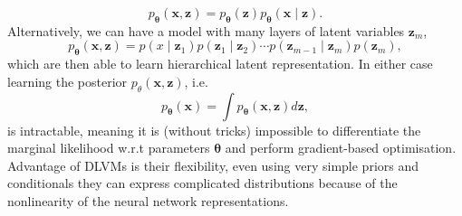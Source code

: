 \begin{equation}
	p_{\boldsymbol{\theta}}(\mathbf{x}, \mathbf{z})=p_{\boldsymbol{\theta}}(\mathbf{z}) p_{\boldsymbol{\theta}}(\mathbf{x} \mid \mathbf{z}).
\end{equation}
Alternatively, we can have a model with many layers of latent variables $\mathbf{z}_m$,
\begin{equation}
	p_{\boldsymbol{\theta}}(\mathbf{x}, \mathbf{\mathbf{z}}) = p\left(x \mid \mathbf{z}_{1}\right) p\left(\mathbf{z}_{1} \mid \mathbf{z}_{2}\right) \cdots p\left(\mathbf{z}_{m-1} \mid \mathbf{z}_{m}\right) p\left(\mathbf{z}_{m}\right),
\end{equation} 
which are then able to learn hierarchical latent representation. In either case learning the posterior $p_{\theta}(\mathbf{x}, \mathbf{z})$, i.e.
\begin{equation}
	p_{\boldsymbol{\theta}}(\mathbf{x})=\int p_{\boldsymbol{\theta}}(\mathbf{x}, \mathbf{z}) d \mathbf{z},
\end{equation}
is intractable, meaning it is (without tricks) impossible to differentiate the marginal likelihood w.r.t parameters $\boldsymbol{\theta}$ and perform gradient-based optimisation. Advantage of DLVMs is their flexibility, even using very simple priors and conditionals they can express complicated distributions because of the nonlinearity of the neural network representations. 

